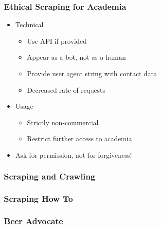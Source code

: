 \begin{frame}
    \frametitle{Ethical Scraping for Academia}
\begin{itemize}
    \item Technical
    \begin{itemize}
    \item Use API if provided
    \item Appear as a bot, not as a human
    \item Provide user agent string with contact data
    \item Decreased rate of requests
    \end{itemize}
    \end{itemize}
    \vspace{5pt}
    \begin{itemize}
    \item Usage
    \begin{itemize}
    \item Strictly non-commercial
    \item Restrict further access to academia
    \end{itemize}
\end{itemize}
    \vspace{5pt}
    \begin{itemize}
    \item Ask for permission, not for forgiveness!
    \end{itemize}
\end{frame}

\begin{frame}
    \frametitle{Scraping and Crawling}

\end{frame}

\begin{frame}
    \frametitle{Scraping How To}

\end{frame}

\begin{frame}
    \frametitle{Beer Advocate}

\end{frame}

